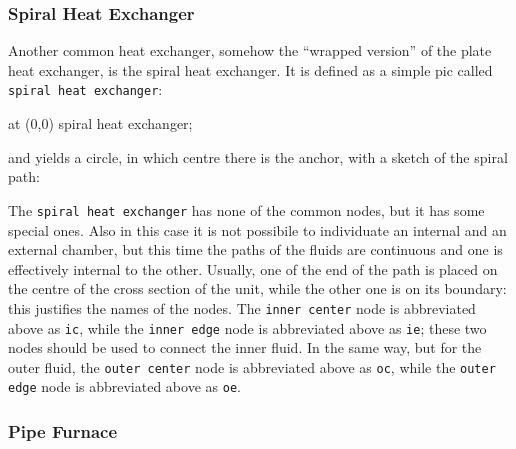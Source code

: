 \documentclass[12pt]{article}						%
\newcommand*{\chpn}[1]{\texttt{#1}}				%
\newcommand*{\chpp}[1]{\texttt{#1}}				%
\begin{document}
\subsubsection{Spiral Heat Exchanger}

Another common heat exchanger, somehow the ``wrapped version'' of the plate
heat exchanger, is the spiral heat exchanger. It is defined as a simple pic
called \chpp{spiral heat exchanger}:
\begin{chpcode}
	\pic at (0,0) {spiral heat exchanger};
\end{chpcode}
and yields a circle, in which centre there is the anchor, with a sketch of
the spiral path:
\begin{center}
\end{center}

The \chpp{spiral heat exchanger} has none of the common nodes, but it has some
special ones. Also in this case it is not possibile to individuate an internal
and an external chamber, but this time the paths of the fluids are continuous and
one is effectively internal to the other. Usually, one of the end of the
path is placed on the centre of the cross section of the unit, while the other
one is on its boundary: this justifies the names of the nodes. The
\chpn{inner center} node is abbreviated above as \chpn{ic}, while the
\chpn{inner edge} node is abbreviated above as \chpn{ie}; these two nodes should
be used to connect the inner fluid. In the same way, but for the outer fluid,
the \chpn{outer center} node is abbreviated above as \chpn{oc}, while the
\chpn{outer edge} node is abbreviated above as \chpn{oe}.

\subsubsection{Pipe Furnace}
\end{document}
